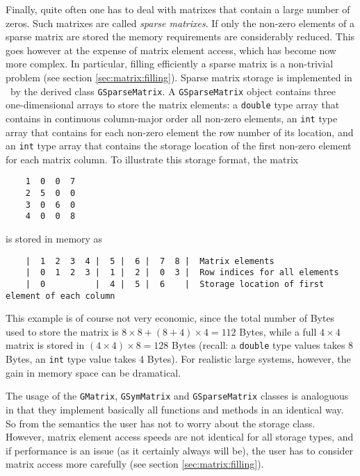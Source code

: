 \documentclass{article}[12pt,a4]
\begin{document}
Finally, quite often one has to deal with matrixes that contain a 
large number of zeros.
Such matrixes are called {\em sparse matrixes}.
If only the non-zero elements of a sparse matrix are stored the memory 
requirements are considerably reduced.
This goes however at the expense of matrix element access, which has 
become now more complex.
In particular, filling efficiently a sparse matrix is a non-trivial 
problem (see section \ref{sec:matrix:filling}).
Sparse matrix storage is implemented in \this\ by the derived class 
{\tt GSparseMatrix}.
A {\tt GSparseMatrix} object contains three one-dimensional arrays to 
store the matrix elements: 
a {\tt double} type array that contains in continuous column-major order 
all non-zero elements, 
an {\tt int} type array that contains for each non-zero element the 
row number of its location, and
an {\tt int} type array that contains the storage location of the 
first non-zero element for each matrix column.
To illustrate this storage format, the matrix
\begin{verbatim}
    1  0  0  7
    2  5  0  0
    3  0  6  0
    4  0  0  8
\end{verbatim}
is stored in memory as 
\begin{verbatim}
    |  1  2  3  4 |  5 |  6 |  7  8 |  Matrix elements
    |  0  1  2  3 |  1 |  2 |  0  3 |  Row indices for all elements
    |  0          |  4 |  5 |  6    |  Storage location of first element of each column
\end{verbatim}
This example is of course not very economic, since the total number of 
Bytes used to store the matrix is 
$8 \times 8 + (8 + 4) \times 4 = 112$ Bytes, while a full $4 \times 4$
matrix is stored in
$(4 \times 4) \times 8 = 128$ Bytes (recall: a {\tt double} type 
values takes 8 Bytes, an {\tt int} type value takes 4 Bytes).
For realistic large systems, however, the gain in memory space can be 
dramatical.

The usage of the {\tt GMatrix}, {\tt GSymMatrix} and {\tt GSparseMatrix} 
classes is analoguous in that they implement basically all functions 
and methods in an identical way.
So from the semantics the user has not to worry about the storage 
class. 
However, matrix element access speeds are not identical for all 
storage types, and if performance is an issue (as it certainly always 
will be), the user has to consider matrix access more carefully
(see section \ref{sec:matrix:filling}).
\end{document}
